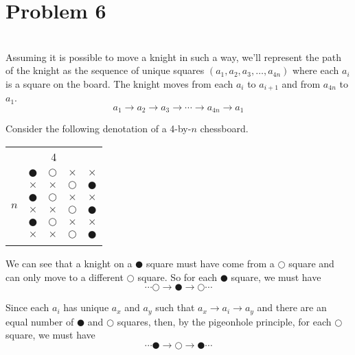 \documentclass[12pt]{article}
\begin{document}
\newpage
\section*{Problem 6}
\\

Assuming it is possible to move a knight in such a way, we'll represent the path of the knight as the sequence of unique squares $(a_1, a_2, a_3,\dots, a_{4n})$ where each $a_i$ is a square on the board. The knight moves from each $a_i$ to $a_{i+1}$ and from $a_{4n}$ to $a_1$.
\[a_1 \longrightarrow a_2 \longrightarrow a_3 \longrightarrow \cdots \longrightarrow a_{4n} \longrightarrow a_1\]

Consider the following denotation of a 4-by-$n$ chessboard.
\begin{center}
    \begin{tabular}{c|c|c|c|c|}
        \multicolumn{5}{c}{\hspace{1.65em}4} \\
        \cline{2-5}
        \multirow{7}{*}{$n$} &
        $\CIRCLE$ & $\Circle$ & $\times$ & $\times$ \\
        \cline{2-5}
        & $\times$ & $\times$ & $\Circle$ & $\CIRCLE$ \\
        \cline{2-5}
        & $\CIRCLE$ & $\Circle$ & $\times$ & $\times$ \\
        \cline{2-5}
        & $\times$ & $\times$ & $\Circle$ & $\CIRCLE$ \\
        \cline{2-5}
        & $\CIRCLE$ & $\Circle$ & $\times$ & $\times$ \\
        \cline{2-5}
        & $\times$ & $\times$ & $\Circle$ & $\CIRCLE$ \\
        \cline{2-5}
        \multicolumn{5}{c}{\hspace{1.65em}$\vdots$}
    \end{tabular}
\end{center}

We can see that a knight on a $\CIRCLE$ square must have come from a $\Circle$ square and can only move to a different $\Circle$ square. So for each $\CIRCLE$ square, we must have
\[\cdots \Circle \longrightarrow \CIRCLE \longrightarrow \Circle \cdots\]

Since each $a_i$ has unique $a_x$ and $a_y$ such that $a_x \longrightarrow a_i \longrightarrow a_y$ and there are an equal number of $\CIRCLE$ and $\Circle$ squares, then, by the pigeonhole principle, for each $\Circle$ square, we must have
\[\cdots \CIRCLE \longrightarrow \Circle \longrightarrow \CIRCLE \cdots\]
\end{document}
